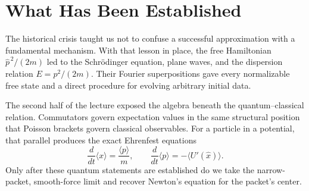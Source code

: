 \section{What Has Been Established}

The historical crisis taught us not to confuse a successful approximation
with a fundamental mechanism. With that lesson in place, the free Hamiltonian
\(\hat p^{\,2}/(2m)\) led to the Schr\"odinger equation, plane waves, and the
dispersion relation \(E=p^2/(2m)\). Their Fourier superpositions gave every
normalizable free state and a direct procedure for evolving arbitrary
initial data.

The second half of the lecture exposed the algebra beneath the
quantum--classical relation. Commutators govern expectation values in the
same structural position that Poisson brackets govern classical
observables. For a particle in a potential, that parallel produces the exact
Ehrenfest equations
\begin{equation}
  \frac{d}{dt}\langle x\rangle=\frac{\langle p\rangle}{m},
  \qquad
  \frac{d}{dt}\langle p\rangle
  =-\langle U'(\hat x)\rangle.
\end{equation}
Only after these quantum statements are established do we take the
narrow-packet, smooth-force limit and recover Newton's equation for the
packet's center.
